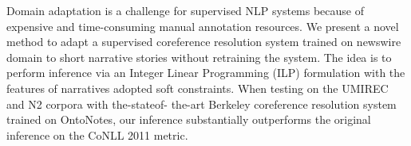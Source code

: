 Domain adaptation is a challenge for supervised NLP systems because of expensive and time-consuming manual annotation resources. We present a novel method to adapt a supervised coreference resolution system trained on newswire domain to short narrative stories without retraining the system. The idea is to perform inference via an Integer Linear Programming (ILP) formulation with the features of narratives adopted  soft constraints. When testing on the UMIREC and N2 corpora with the-stateof- the-art Berkeley coreference resolution system trained on OntoNotes, our inference substantially outperforms the original inference on the CoNLL 2011 metric.
